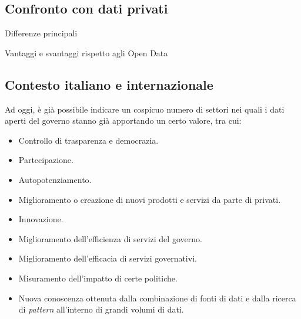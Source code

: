 \subsection{Confronto con dati privati}
Differenze principali

Vantaggi e svantaggi rispetto agli Open Data

\subsection{Contesto italiano e internazionale}
Ad oggi, è già possibile indicare un cospicuo numero di settori nei quali i dati aperti del governo stanno già apportando un certo valore, tra cui:

\begin{itemize}
    \item Controllo di trasparenza e democrazia.
    \item Partecipazione.
    \item Autopotenziamento.
    \item Miglioramento o creazione di nuovi prodotti e servizi da parte di privati.
    \item Innovazione.
    \item Miglioramento dell'efficienza di servizi del governo.
    \item Miglioramento dell'efficacia di servizi governativi.
    \item Misuramento dell'impatto di certe politiche.
    \item Nuova conoscenza ottenuta dalla combinazione di fonti di dati e dalla ricerca di \textit{pattern} all'interno di grandi volumi di dati.
\end{itemize}

